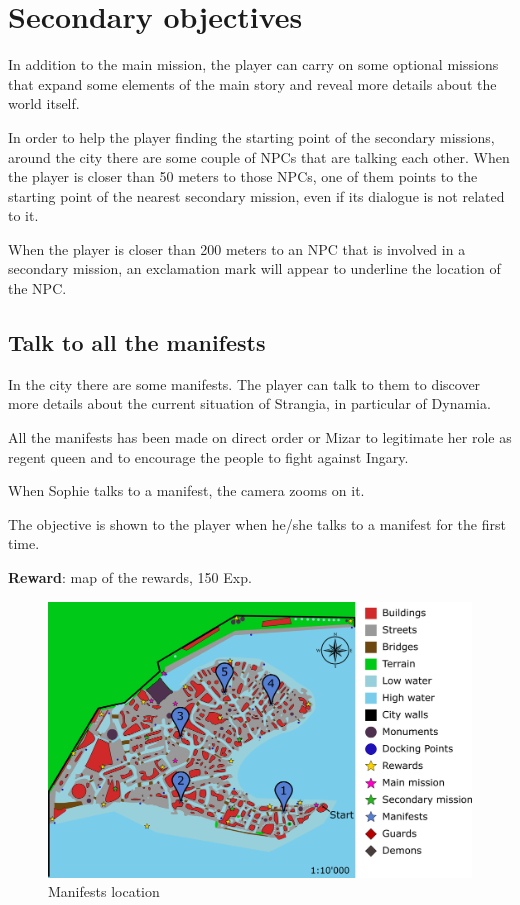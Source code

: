 \section{Secondary objectives}
In addition to the main mission, the player can carry on some optional missions that expand some elements of the main story and reveal more details about the world itself.

In order to help the player finding the starting point of the secondary missions, around the city there are some couple of NPCs that are talking each other. When the player is closer than 50 meters to those NPCs, one of them points to the starting point of the nearest secondary mission, even if its dialogue is not related to it.

When the player is closer than 200 meters to an NPC that is involved in a secondary mission, an exclamation mark will appear to underline the location of the NPC.

\subsection{Talk to all the manifests}
In the city there are some manifests. The player can talk to them to discover more details about the current situation of Strangia, in particular of Dynamia.

All the manifests has been made on direct order or Mizar to legitimate her role as regent queen and to encourage the people to fight against Ingary.

When Sophie talks to a manifest, the camera zooms on it.

The objective is shown to the player when he/she talks to a manifest for the first time.

\textbf{Reward}: map of the rewards, 150 Exp.

\begin{figure}[H]
  \centering
  \includegraphics[width=\textwidth]{../Images/Maps/dynamiaSecondaryMissions_Manifests}
  \caption{Manifests location}
\end{figure}

